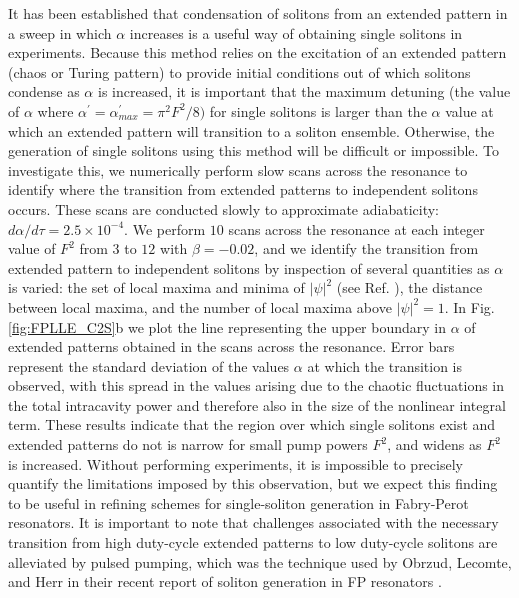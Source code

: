 It has been established that condensation of solitons from an extended pattern in a sweep in which $\alpha$ increases is a useful way of obtaining single solitons in experiments. Because this method relies on the excitation of an extended pattern (chaos or Turing pattern) to provide initial conditions out of which solitons condense as $\alpha$ is increased, it is important that the maximum detuning (the value of $\alpha$ where $\alpha^\prime=\alpha_{max}^\prime=\pi^2 F^2/8)$ for single solitons is larger than the $\alpha$ value at which an extended pattern will transition to a soliton ensemble. Otherwise, the generation of single solitons using this method will be difficult or impossible. To investigate this, we numerically perform slow scans across the resonance to identify where the transition from extended patterns to independent solitons occurs. These scans are conducted slowly to approximate adiabaticity: $d\alpha/d\tau=2.5\times10^{-4}$. We perform $10$ scans across the resonance at each integer value of $F^2$ from $3$ to $12$ with $\beta=-0.02$, and we identify the transition from extended pattern to independent solitons by inspection of several quantities as $\alpha$ is varied: the set of local maxima and minima of $|\psi|^2$ (see Ref. ), the distance between local maxima, and the number of local maxima above $|\psi|^2=1$. In Fig. \ref{fig:FPLLE_C2S}b we plot the line representing the upper boundary in $\alpha$ of extended patterns obtained in the scans across the resonance. Error bars represent the standard deviation of the values $\alpha$ at which the transition is observed, with this spread in the values arising due to the chaotic fluctuations in the total intracavity power and therefore also in the size of the nonlinear integral term. These results indicate that the region over which single solitons exist and extended patterns do not is narrow for small pump powers $F^2$, and widens as $F^2$ is increased. Without performing experiments, it is impossible to precisely quantify the limitations imposed by this observation, but we expect this finding to be useful in refining schemes for single-soliton generation in Fabry-Perot resonators. It is important to note that challenges associated with the necessary transition from high duty-cycle extended patterns to low duty-cycle solitons are alleviated by pulsed pumping, which was the technique used by Obrzud, Lecomte, and Herr in their recent report of soliton generation in FP resonators \cite{Obrzud2017}.



